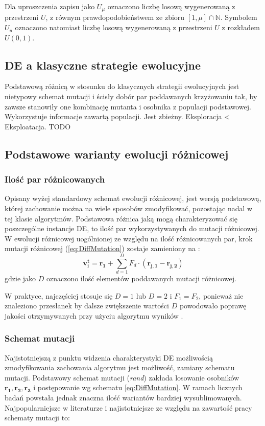 \documentclass[12pt,a4paper]{report}
\begin{document}
{{{Dla uproszczenia zapisu jako $U_\mu$ oznaczono liczbę losową wygenerowaną z przestrzeni $U$, z równym prawdopodobieństwem ze zbioru $[1, \mu] \cap \mathbb{N}$. Symbolem $U_u$ oznaczono natomiast liczbę losową wygenerowaną z przestrzeni $U$ z rozkładem $U(0,1)$.
}

\subsection{DE a klasyczne strategie ewolucyjne}
\par{
Podstawową różnicą w stosunku do klasycznych strategii ewolucyjnych jest nietypowy schemat mutacji i ścisły dobór par poddawanych krzyżowaniu tak, by zawsze stanowiły one kombinację mutanta i osobnika z populacji  podstawowej.
Wykorzystuje informacje zawartą populacji.
Jest zbieżny.
Eksploracja < Eksploatacja.
TODO
}


\subsection{Podstawowe warianty ewolucji różnicowej}
\subsubsection{Ilość par różnicowanych}
\par{
Opisany wyżej standardowy schemat ewolucji różnicowej, jest wersją podstawową, której zachowanie można na wiele sposobów zmodyfikować, pozostając nadal w tej klasie algorytmów. Podstawowa różnica jaką mogą charakteryzować się poszczególne instancje DE, to ilość par wykorzystywanych do mutacji różnicowej. W ewolucji różnicowej uogólnionej ze względu na ilość różnicowanych par, krok mutacji różnicowej (\ref{eq:DiffMutation}) zostaje zamieniony na \cite{PracticalInsights}:
\begin{equation}
\mathbf{v_i^{t}} = \mathbf{r_1} + \sum_{d = 1}^D F_d \cdot (\mathbf{r_{j,1}} - \mathbf{r_{j,2}})
\end{equation}
gdzie jako $D$ oznaczono ilość elementów poddawanych mutacji różnicowej.
}
\par{
W praktyce, najczęściej stosuje się $D = 1$ lub $D = 2$ i $F_1 = F_2$, ponieważ nie znaleziono przesłanek by dalsze zwiększenie wartości $D$ powodowało poprawę jakości otrzymywanych przy użyciu algorytmu wyników \cite{PracticalInsights}.
\subsubsection{Schemat mutacji}
\par{
Najistotniejszą z punktu widzenia charakterystyki DE możliwością zmodyfikowania zachowania algorytmu jest możliwość, zamiany schematu mutacji. Podstawowy schemat mutacji (\emph{rand}) zakłada losowanie osobników $\mathbf{r_1}, \mathbf{r_2}, \mathbf{r_3}$ i postępowanie wg schematu \ref{eq:DiffMutation}. W ramach licznych badań powstała jednak znaczna ilość wariantów bardziej wysublimowanych. Najpopularniejsze w literaturze i najistotniejsze ze względu na zawartość pracy schematy mutacji to:
\begin{description}


\end{description}}}}}
\end{document}
